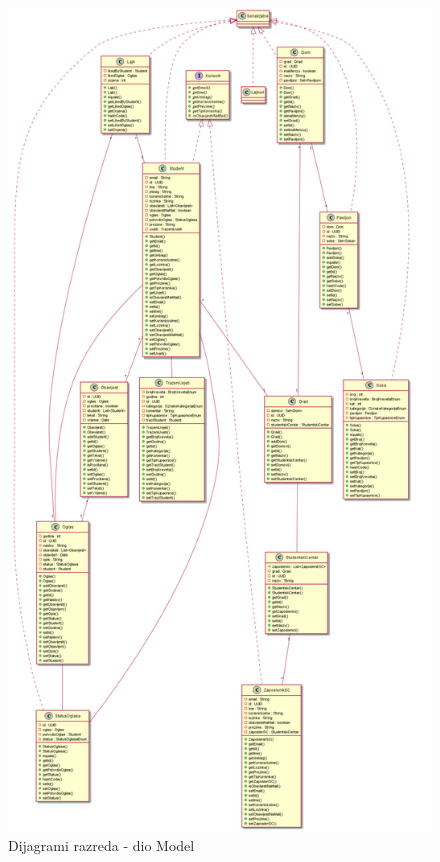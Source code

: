 			\begin{figure}[H]
				\includegraphics[scale=0.3]{dijagrami/model.png} %
				\centering
				\caption{Dijagrami razreda - dio Model}
				\label{fig:model}
			\end{figure}
		

